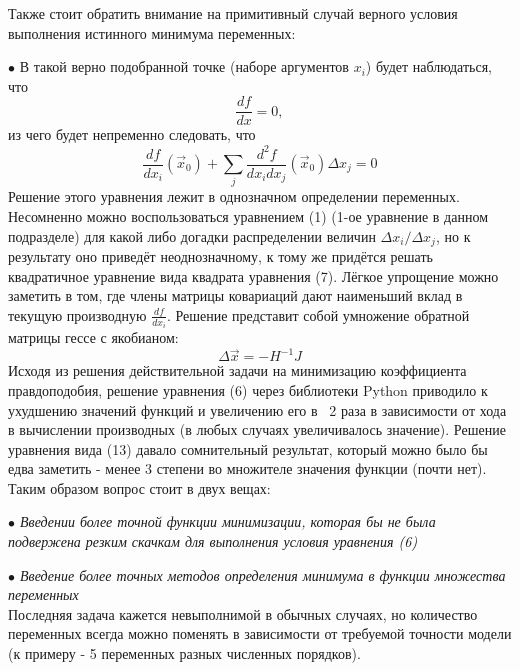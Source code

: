 \documentclass[a4paper,12pt]{article}
\begin{document}
Также стоит обратить внимание на примитивный случай верного условия выполнения истинного минимума переменных:

$\bullet$ В такой верно подобранной точке (наборе аргументов $x_i$) будет наблюдаться, что
\begin{equation}
	\frac{df}{dx} = 0,
\end{equation}
из чего будет непременно следовать, что
\begin{equation}
	\frac{df}{dx_i}(\vec{x}_0) + \sum_{j}\frac{d^2 f}{dx_i dx_j}(\vec{x}_0)\Delta x_j = 0
\end{equation}
Решение этого уравнения лежит в однозначном определении переменных. Несомненно можно воспользоваться уравнением (1) (1-ое уравнение в данном подразделе) для какой либо догадки распределении величин $\Delta{x_i}/\Delta{x_j}$, но к результату оно приведёт неоднозначному, к тому же придётся решать квадратичное уравнение вида квадрата уравнения (7). Лёгкое упрощение можно заметить в том, где члены матрицы ковариаций дают наименьший вклад в текущую производную $\frac{df}{dx_i}$. Решение представит собой умножение обратной матрицы гессе с якобианом:
\begin{equation}
	\Delta{\vec{x}} = -H^{-1} J
\end{equation}
Исходя из решения действительной задачи на минимизацию коэффициента правдоподобия, решение уравнения (6) через библиотеки Python приводило к ухудшению значений функций и увеличению его в ~2 раза в зависимости от хода в вычислении производных (в любых случаях увеличивалось значение). Решение уравнения вида (13) давало сомнительный результат, который можно было бы едва заметить - менее 3 степени во множителе значения функции (почти нет). Таким образом вопрос стоит в двух вещах:

\textit{$\bullet$ Введении более точной функции минимизации, которая бы не была подвержена резким скачкам для выполнения условия уравнения (6)}

\textit{$\bullet$ Введение более точных методов определения минимума в функции множества переменных}\\
Последняя задача кажется невыполнимой в обычных случаях, но количество переменных всегда можно поменять в зависимости от требуемой точности модели (к примеру - 5 переменных разных численных порядков).
\end{document}
